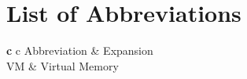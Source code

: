 
\chapter{List of Abbreviations}
\label{appendixa}

\begin{tabular}{\textbf{c} c}
    Abbreviation & Expansion      \\
    VM           & Virtual Memory
\end{tabular}
